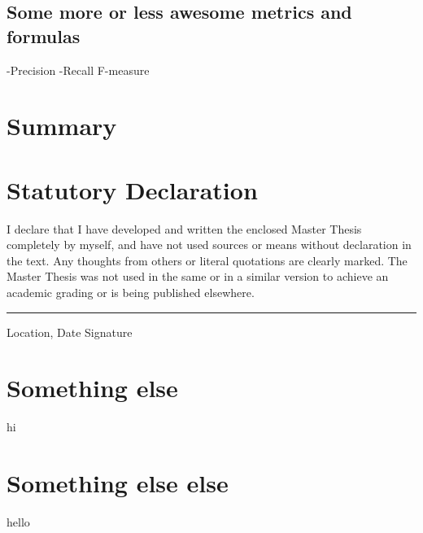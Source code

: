 \documentclass[12pt, twoside]{report}
\begin{document}
\section{Some more or less awesome metrics and formulas}
-Precision -Recall F-measure


\chapter{Summary}


\appendix
\chapter{Statutory Declaration}
I declare that I have developed and written the enclosed Master Thesis completely by myself, and have not used sources or means without declaration in the text. Any thoughts from others or literal quotations are clearly marked. The Master Thesis was not used in the same or in a similar version to achieve an academic grading or is being published elsewhere.
\newline
\newline
\newline
\rule{\textwidth}{1pt}
Location, Date \hfill Signature 

\chapter{Something else}
hi

\chapter{Something else else}
hello

\printbibliography
\end{document}
